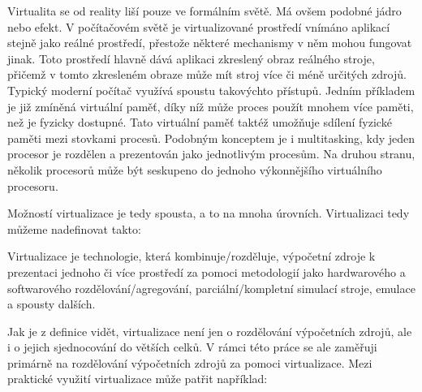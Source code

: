 Virtualita se od reality liší pouze ve formálním světě. Má ovšem podobné jádro nebo efekt. V počítačovém světě je virtualizované prostředí vnímáno aplikací stejně jako reálné prostředí, přestože některé mechanismy v něm mohou fungovat jinak. Toto prostředí hlavně dává aplikaci zkreslený obraz reálného stroje, přičemž v tomto zkresleném obraze může mít stroj více či méně určitých zdrojů. Typický moderní počítač využívá spoustu takovýchto přístupů. Jedním příkladem je již zmíněná virtuální paměť, díky níž může proces použít mnohem více paměti, než je fyzicky dostupné. Tato virtuální paměť taktéž umožňuje sdílení fyzické paměti mezi stovkami procesů. Podobným konceptem je i multitasking, kdy jeden procesor je rozdělen a prezentován jako  jednotlivým procesům. Na druhou stranu, několik procesorů může být seskupeno do jednoho výkonnějšího virtuálního procesoru.\,\cite{chiueh2005survey}

Možností virtualizace je tedy spousta, a to na mnoha úrovních. Virtualizaci tedy můžeme nadefinovat takto:

\begin{displayquote}
    Virtualizace je technologie, která kombinuje/rozděluje, výpočetní zdroje k prezentaci jednoho či více prostředí za pomoci metodologií jako hardwarového a softwarového rozdělování/agregování, parciální/kompletní simulací stroje, emulace a spousty dalších.\,\cite{chiueh2005survey}
\end{displayquote}

Jak je z definice vidět, virtualizace není jen o rozdělování výpočetních zdrojů, ale i o jejich sjednocování do větších celků. V rámci této práce se ale zaměřuji primárně na rozdělování výpočetních zdrojů za pomoci virtualizace. Mezi praktické využití virtualizace může patřit například:

